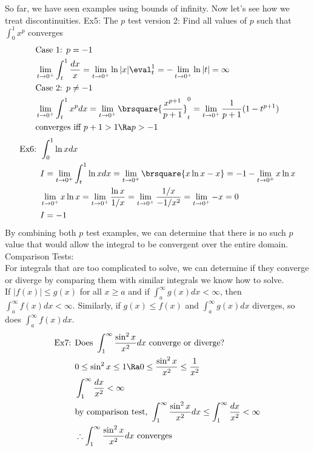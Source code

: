 So far, we have seen examples using bounds of infinity. Now let's see how we treat discontinuities.
Ex5: The $p$ test version 2: Find all values of $p$ such that $\int_0^1x^p$ converges
\begin{align*}
    &\text{Case 1: }p=-1\\
    &\lim_{t\to0^+}\int_t^1\frac{dx}{x}=\lim_{t\to0^+}{\ln|x|}\eval_t^1=-\lim_{t\to0^+}\ln|t|=\infty\\
    &\text{Case 2: }p\neq -1\\
    &\lim_{t\to0^+}\int_t^1x^pdx=\lim_{t\to0^+}\brsquare{\frac{x^{p+1}}{p+1}}_t^0=\lim_{t\to0^+}\frac{1}{p+1}(1-t^{p+1})\\
    &\text{converges iff }p+1>1\Ra p>-1
\end{align*}
\begin{align*}
    \text{Ex6: }&\int_0^1\ln xdx\\
    &I=\lim_{t\to0^+}\int_t^1\ln xdx=\lim_{t\to0^+}\brsquare{x\ln x-x}=-1-\lim_{t\to0^+}x\ln x\\
    &\lim_{t\to0^+}x\ln x=\lim_{t\to0^+}\frac{\ln x}{1/x}=\lim_{t\to0^+}\frac{1/x}{-1/x^2}=\lim_{t\to0^+}-x=0\\
    &I=-1
\end{align*}
By combining both $p$ test examples, we can determine that there is no such $p$ value that would allow the integral to be convergent over the entire domain.\\

Comparison Tests:\\
For integrals that are too complicated to solve, we can determine if they converge or diverge by comparing them with similar integrals we know how to solve.\\
If $|f(x)|\leq g(x)$ for all $x\geq a$ and if $\int_a^\infty g(x)dx<\infty$, then $\int_a^\infty f(x)dx<\infty$. Similarly, if $g(x)\leq f(x)$ and $\int_a^\infty g(x)dx$ diverges, so does $\int_a^\infty f(x)dx$.
\begin{align*}
    \text{Ex7: }&\text{Does }\int_1^\infty\frac{\sin^2x}{x^2}dx\text{ converge or diverge?}\\
    &0\leq\sin^2x\leq 1\Ra 0\leq \frac{\sin^2x}{x^2}\leq\frac{1}{x^2}\\
    &\int_1^\infty\frac{dx}{x^2}<\infty\\
    &\text{by comparison test, }\int_1^\infty\frac{\sin^2x}{x^2}dx\leq\int_1^\infty\frac{dx}{x^2}<\infty\\
    &\therefore \int_1^\infty\frac{\sin^2x}{x^2}dx\text{ converges}
\end{align*}